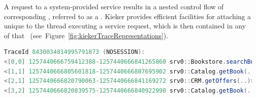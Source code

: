 A request to a system-provided service results in a nested control flow of %
corresponding \executions{}, referred to as a \textit{\trace{}}. %
Kieker provides efficient facilities for attaching a unique \traceIdentifier{} %
to the thread executing a service request, which is then contained in any %
\KiekerExecutionRecord{} of that \trace{}~(see~Figure~\ref{fig:kiekerTraceRepresentations}). 

\begin{lstlisting}[language=Java, float=*, numbers=none, xleftmargin=0pt,caption=Kieker.Tpan output of execution trace representation, label=lst:ExecutionRecordMonitoringLogExecutionTrace, basicstyle=\ttfamily\scriptsize]
TraceId 8430034814995791873 (NOSESSION):
<[0,0] 1257440666759412388-1257440666841265860 srv0::Bookstore.searchBook(..)>
<[1,1] 1257440666805601818-1257440666807695902 srv0::Catalog.getBook(..)>
<[2,1] 1257440666820790063-1257440666841169272 srv0::CRM.getOffers(..)>
<[3,2] 1257440666820839575-1257440666840922990 srv0::Catalog.getBook(..)>
\end{lstlisting}


